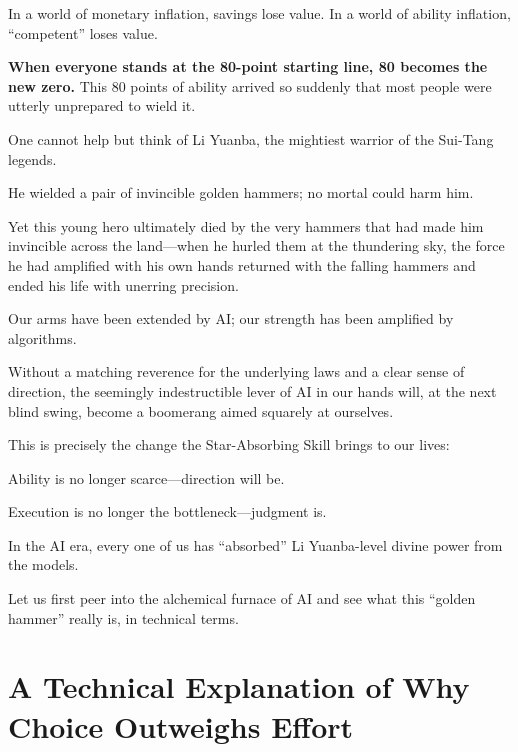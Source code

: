 \vspace{1em}

In a world of monetary inflation, savings lose value. In a world of ability inflation, ``competent'' loses value.

\textbf{When everyone stands at the 80-point starting line, 80 becomes the new zero.} This 80 points of ability arrived so suddenly that most people were utterly unprepared to wield it.

\vspace{1em}

One cannot help but think of Li Yuanba, the mightiest warrior of the Sui-Tang legends.

He wielded a pair of invincible golden hammers; no mortal could harm him.

Yet this young hero ultimately died by the very hammers that had made him invincible across the land---when he hurled them at the thundering sky, the force he had amplified with his own hands returned with the falling hammers and ended his life with unerring precision.

\vspace{1em}

Our arms have been extended by AI; our strength has been amplified by algorithms.

Without a matching reverence for the underlying laws and a clear sense of direction, the seemingly indestructible lever of AI in our hands will, at the next blind swing, become a boomerang aimed squarely at ourselves.

\vspace{1em}

This is precisely the change the Star-Absorbing Skill brings to our lives:

Ability is no longer scarce---direction will be.

Execution is no longer the bottleneck---judgment is.

\vspace{1em}

In the AI era, every one of us has ``absorbed'' Li Yuanba-level divine power from the models.

Let us first peer into the alchemical furnace of AI and see what this ``golden hammer'' really is, in technical terms.

\newpage
\section{A Technical Explanation of Why Choice Outweighs Effort}

